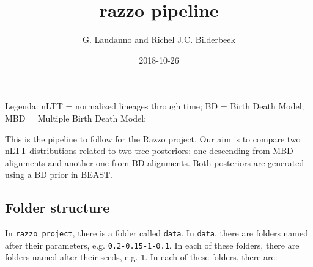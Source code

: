 \documentclass[]{article}
\title{razzo pipeline}
\author{G. Laudanno and Richel J.C. Bilderbeek}
\date{2018-10-26}
\begin{document}
\maketitle

Legenda: nLTT = normalized lineages through time; BD = Birth Death
Model; MBD = Multiple Birth Death Model;

This is the pipeline to follow for the Razzo project. Our aim is to
compare two nLTT distributions related to two tree posteriors: one
descending from MBD alignments and another one from BD alignments. Both
posteriors are generated using a BD prior in BEAST.

\subsection{Folder structure}\label{folder-structure}

In \texttt{razzo\_project}, there is a folder called \texttt{data}. In
\texttt{data}, there are folders named after their parameters, e.g.
\texttt{0.2-0.15-1-0.1}. In each of these folders, there are folders
named after their seeds, e.g. \texttt{1}. In each of these folders,
there are:
\end{document}
